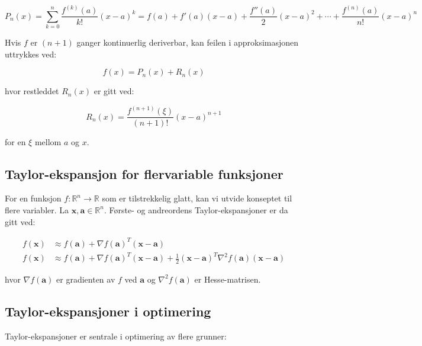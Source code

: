 \begin{equation}
	P_n(x) = \sum_{k=0}^{n} \frac{f^{(k)}(a)}{k!}(x-a)^k = f(a) + f'(a)(x-a) + \frac{f''(a)}{2}(x-a)^2 + \cdots + \frac{f^{(n)}(a)}{n!}(x-a)^n
\end{equation}

Hvis $f$ er $(n+1)$ ganger kontinuerlig deriverbar, kan feilen i approksimasjonen uttrykkes ved:

\begin{equation}
	f(x) = P_n(x) + R_n(x)
\end{equation}

hvor restleddet $R_n(x)$ er gitt ved:

\begin{equation}
	R_n(x) = \frac{f^{(n+1)}(\xi)}{(n+1)!}(x-a)^{n+1}
\end{equation}

for en $\xi$ mellom $a$ og $x$.

\subsection{Taylor-ekspansjon for flervariable funksjoner}

For en funksjon $f: \mathbb{R}^n \to \mathbb{R}$ som er tilstrekkelig glatt, kan vi utvide konseptet til flere variabler. La $\symbf{x}, \symbf{a} \in \mathbb{R}^n$. Første- og andreordens Taylor-ekspansjoner er da gitt ved:

\begin{align}
	f(\symbf{x}) & \approx f(\symbf{a}) + \nabla f(\symbf{a})^T(\symbf{x}-\symbf{a})                                                                                \\
	f(\symbf{x}) & \approx f(\symbf{a}) + \nabla f(\symbf{a})^T(\symbf{x}-\symbf{a}) + \frac{1}{2}(\symbf{x}-\symbf{a})^T\nabla^2 f(\symbf{a})(\symbf{x}-\symbf{a})
\end{align}

hvor $\nabla f(\symbf{a})$ er gradienten av $f$ ved $\symbf{a}$ og $\nabla^2 f(\symbf{a})$ er Hesse-matrisen.

\subsection{Taylor-ekspansjoner i optimering}

Taylor-ekspansjoner er sentrale i optimering av flere grunner:

